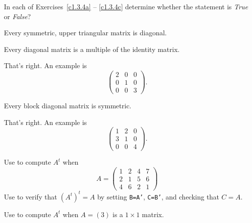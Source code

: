\documentclass{ximera}
\begin{document}
\noindent In each of Exercises~\ref{c1.3.4a} -- \ref{c1.3.4c} determine
whether the statement is {\em True\/} or {\em False\/}?
\begin{exercise} \label{c1.3.4a}
  Every symmetric, upper triangular matrix is diagonal.
  \begin{multipleChoice}
  \end{multipleChoice}
\end{exercise}
\begin{exercise} \label{c1.3.4b}
  Every diagonal matrix is a multiple of the identity matrix.
  \begin{multipleChoice}
  \end{multipleChoice}
  \begin{feedback}
    That's right.   An example is
    \[\left(\begin{array}{ccc}
              2 & 0 & 0 \\
              0 & 1 & 0 \\
              0 & 0 & 3 \end{array}\right).\]
  \end{feedback}
\end{exercise}
\begin{exercise} \label{c1.3.4c}
  Every block diagonal matrix is symmetric.
  \begin{multipleChoice}
  \end{multipleChoice}
  \begin{feedback}
    That's right.   An example is
    \[ \left(\begin{array}{ccc}
               1 & 2 & 0 \\
               3 & 1 & 0 \\
               0 & 0 & 4
             \end{array}\right).
         \]
  \end{feedback}  
\end{exercise}

\CEXER

\begin{exercise} \label{c1.3.5a}
Use \Matlab to compute $A^t$ when
\begin{equation} 
A = \left(\begin{array}{cccc} 
1 & 2 & 4 & 7 \\ 2 & 1 & 5 & 6 \\  4 & 6 & 2 & 1 
\end{array}\right)
\end{equation}
Use \Matlab to verify that $(A^t)^t=A$ by setting {\tt B=A'}, {\tt C=B'},
and checking that $C=A$.
\end{exercise}

\begin{exercise} \label{c1.3.5b}
Use \Matlab to compute $A^t$ when $A=(3)$ is a $1\times 1$ matrix.
\end{exercise}
\end{document}
